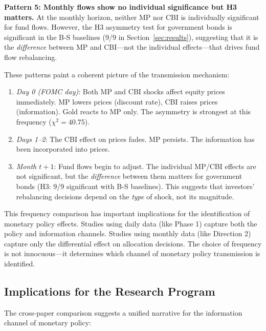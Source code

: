 \documentclass[11pt,a4paper]{article}
\begin{document}
\textbf{Pattern 5: Monthly flows show no individual significance but H3 matters.} At the monthly horizon, neither MP nor CBI is individually significant for fund flows. However, the H3 asymmetry test for government bonds is significant in the B-S baselines (9/9 in Section~\ref{sec:results}), suggesting that it is the \textit{difference} between MP and CBI---not the individual effects---that drives fund flow rebalancing.

These patterns paint a coherent picture of the transmission mechanism:

\begin{enumerate}
    \item \textit{Day 0 (FOMC day)}: Both MP and CBI shocks affect equity prices immediately. MP lowers prices (discount rate), CBI raises prices (information). Gold reacts to MP only. The asymmetry is strongest at this frequency ($\chi^2 = 40.75$).
    
    \item \textit{Days 1--2}: The CBI effect on prices fades. MP persists. The information has been incorporated into prices.
    
    \item \textit{Month $t+1$}: Fund flows begin to adjust. The individual MP/CBI effects are not significant, but the \textit{difference} between them matters for government bonds (H3: 9/9 significant with B-S baselines). This suggests that investors' rebalancing decisions depend on the \textit{type} of shock, not its magnitude.
\end{enumerate}

This frequency comparison has important implications for the identification of monetary policy effects. Studies using daily data (like Phase 1) capture both the policy and information channels. Studies using monthly data (like Direction 2) capture only the differential effect on allocation decisions. The choice of frequency is not innocuous---it determines which channel of monetary policy transmission is identified.

\subsection{Implications for the Research Program}

The cross-paper comparison suggests a unified narrative for the information channel of monetary policy:
\end{document}

